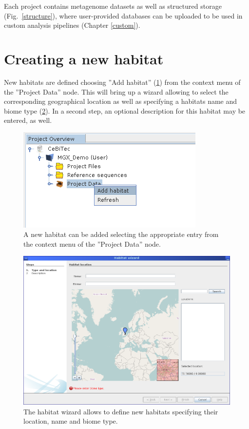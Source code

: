 Each project contains metagenome datasets as well as structured storage (Fig.~\ref{structure}), where user-provided
databases can be uploaded to be used in custom analysis pipelines (Chapter \ref{custom}).

\section{Creating a new habitat}

New habitats are defined choosing ''Add habitat'' (\ref{addhabitat}) from the context menu of the ''Project Data''
node. This will bring up a wizard allowing to select the corresponding geographical location as well as
specifying a habitats name and biome type (\ref{habwiz}). In a second step, an optional description for this
habitat may be entered, as well.

\begin{figure}[H]
\centering
\includegraphics[width=.6\textwidth]{img/mgx/addhabitat}
\caption[Habitat creation]{A new habitat can be added selecting the appropriate entry from the context
menu of the ''Project Data'' node.}
\label{addhabitat}
\end{figure}

\begin{figure}[H]
\centering
\includegraphics[width=.8\textwidth]{img/mgx/habwizard}
\caption[Habitat wizard]{The habitat wizard allows to define new habitats specifying their location, name and
biome type.}
\label{habwiz}
\end{figure}

